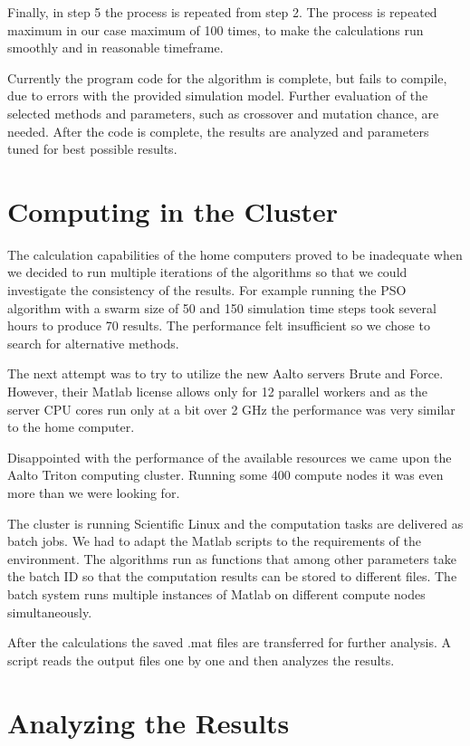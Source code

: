 \documentclass[twoside]{article}
\begin{document}
\begin{multicols}{2}
	Finally, in step 5 the process is repeated from step 2. The process is repeated maximum in our case maximum of 100 times, to make the calculations run smoothly and in reasonable timeframe.
	
	Currently the program code for the algorithm is complete, but fails to compile, due to errors with the provided simulation model. Further evaluation of the selected methods and parameters, such as crossover and mutation chance, are needed. After the code is complete, the results are analyzed and parameters tuned for best possible results.
	
	
	\section{Computing in the Cluster}
	The calculation capabilities of the home computers proved to be inadequate when we decided to run multiple iterations of the algorithms so that we could investigate the consistency of the results. For example running the PSO algorithm with a swarm size of 50 and 150 simulation time steps took several hours to produce 70 results. The performance felt insufficient so we chose to search for alternative methods.
	
	The next attempt was to try to utilize the new Aalto servers Brute and Force. However, their Matlab license allows only for 12 parallel workers and as the server CPU cores run only at a bit over 2 GHz the performance was very similar to the home computer.
	
	Disappointed with the performance of the available resources we came upon the Aalto Triton computing cluster. Running some 400 compute nodes it was even more than we were looking for.
	
	The cluster is running Scientific Linux and the computation tasks are delivered as batch jobs. We had to adapt the Matlab scripts to the requirements of the environment. The algorithms run as functions that among other parameters take the batch ID so that the computation results can be stored to different files. The batch system runs multiple instances of Matlab on different compute nodes simultaneously. 
	
	After the calculations the saved .mat files are transferred for further analysis. A script reads the output files one by one and then analyzes the results.
	
	
	
\section{Analyzing the Results}



\end{multicols}
\end{document}
